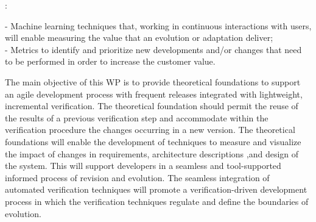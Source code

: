\documentclass[12pt]{article}
\begin{document}
:
 
 - Machine learning techniques that, working in continuous interactions with users, will enable measuring the value that an evolution or adaptation deliver;\\ 
 - Metrics to identify and prioritize new developments and/or changes that need to be performed in order to increase the customer value.

\vspace{.2cm}

\noindent The main objective of this WP is to provide theoretical foundations to %
support an agile development process with frequent releases integrated with lightweight, incremental verification.  The theoretical foundation should permit the %
reuse %
of the results of a previous verification step and accommodate within the verification procedure the changes  occurring in a new version.
The theoretical foundations %
will enable the development of techniques to measure and visualize the impact of changes in 
 requirements,  architecture descriptions ,and design of the system. This will support developers in a seamless and tool-supported informed process of revision and evolution.
The seamless integration of automated verification techniques will promote a verification-driven development process in which the verification techniques regulate and define the boundaries of evolution. 
\end{document}
